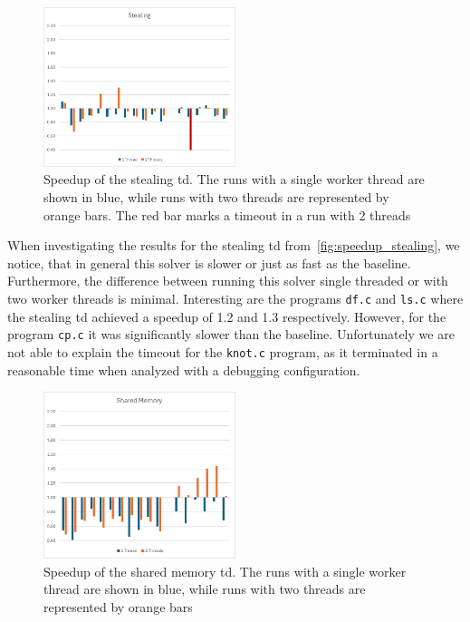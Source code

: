   \begin{figure}
    \includegraphics[width=0.5\textwidth]{../resources/Stealing_draft.png}
    \caption[Speedup of the stealing \ac{td}]{Speedup of the stealing \ac{td}. The runs with a single worker thread are shown in blue, while runs with two threads are represented by orange bars. The red bar marks a timeout in a run with 2 threads}
    \label{fig:speedup_stealing}
  \end{figure}

  When investigating the results for the stealing \ac{td} from~\autoref{fig:speedup_stealing}, we notice, that in general this solver is slower or just as fast as the baseline. Furthermore, the difference between running this solver single threaded or with two worker threads is minimal. Interesting are the programs \texttt{df.c} and \texttt{ls.c} where the stealing \ac{td} achieved a speedup of 1.2 and 1.3 respectively. However, for the program \texttt{cp.c} it was significantly slower than the baseline. Unfortunately we are not able to explain the timeout for the \texttt{knot.c} program, as it terminated in a reasonable time when analyzed with a debugging configuration.

  \begin{figure}
    \includegraphics[width=0.5\textwidth]{../resources/SharedMem_draft.png}
    \caption[Speedup of the shared memory \ac{td}]{Speedup of the shared memory \ac{td}. The runs with a single worker thread are shown in blue, while runs with two threads are represented by orange bars}
    \label{fig:speedup_shared_mem}
  \end{figure}

